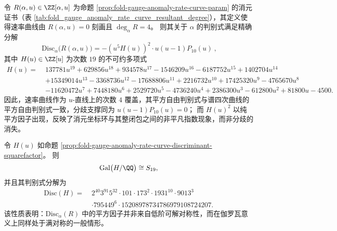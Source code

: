 \begin{proposition}[速率曲线消元模型的判别式平方因子分解]\label{prop:fold-gauge-anomaly-rate-curve-discriminant-squarefactor}
令 \(R(\alpha,u)\in\ZZ[\alpha,u]\) 为命题 \ref{prop:fold-gauge-anomaly-rate-curve-param} 的消元证书（表 \ref{tab:fold_gauge_anomaly_rate_curve_resultant_degree}），其定义使得速率曲线由 \(R(\alpha,u)=0\) 刻画且 \(\deg_{\alpha}R=4\)。
则其关于 \(\alpha\) 的判别式满足精确分解
\[
\boxed{\ \mathrm{Disc}_{\alpha}\bigl(R(\alpha,u)\bigr)=-(u^{5}H(u))^{2}\cdot u(u-1)P_{10}(u)\ },
\]
其中 \(H(u)\in\ZZ[u]\) 为次数 \(19\) 的不可约多项式
\[
\begin{aligned}
H(u)=\;&137781u^{19}+629856u^{18}+934578u^{17}-1546209u^{16}-6187752u^{15}+1402704u^{14}\\
&+15349014u^{13}-3368736u^{12}-17688806u^{11}+2216732u^{10}+17425320u^{9}-4765670u^{8}\\
&-11620472u^{7}+7448180u^{6}+2529720u^{5}-4736240u^{4}+2386300u^{3}-612800u^{2}+81800u-4500.
\end{aligned}
\]
因此，速率曲线作为 \(u\)-直线上的次数 \(4\) 覆盖，其平方自由判别式与谱四次曲线的平方自由判别式一致，分歧支撑同为 \(u(u-1)P_{10}(u)=0\)；
而 \(H(u)^{2}\) 以纯平方因子出现，反映了消元坐标环与其整闭包之间的非平凡指数现象，而非分歧的消失。
\end{proposition}

\begin{proposition}\label{prop:fold-gauge-anomaly-H-galois-discriminant}
令 \(H(u)\) 如命题 \ref{prop:fold-gauge-anomaly-rate-curve-discriminant-squarefactor}。
则
\[
\mathrm{Gal}\bigl(H/\QQ\bigr)\cong S_{19},
\]
并且其判别式分解为
\[
\begin{aligned}
\mathrm{Disc}(H)=\;&2^{40}3^{91}5^{32}\cdot 101\cdot 173^{2}\cdot 1931^{10}\cdot 9013^{3}\\
&\cdot 795449^{6}\cdot 15208978734786979108724207.
\end{aligned}
\]
该性质表明：\(\mathrm{Disc}_{\alpha}(R)\) 中的平方因子并非来自低阶可解对称性，而在伽罗瓦意义上同样处于满对称的一般情形。
\end{proposition}

